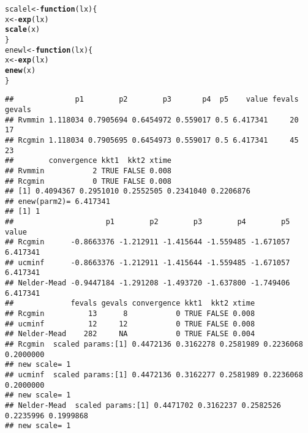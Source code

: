 \documentclass[11pt]{article}\usepackage[]{graphicx}\usepackage[]{color}
\makeatletter
\newcommand{\hlstd}[1]{\textcolor[rgb]{0.345,0.345,0.345}{#1}}%
\newcommand{\hlkwa}[1]{\textcolor[rgb]{0.161,0.373,0.58}{\textbf{#1}}}%
\newcommand{\hlkwb}[1]{\textcolor[rgb]{0.69,0.353,0.396}{#1}}%
\newcommand{\hlkwc}[1]{\textcolor[rgb]{0.333,0.667,0.333}{#1}}%
\newcommand{\hlkwd}[1]{\textcolor[rgb]{0.737,0.353,0.396}{\textbf{#1}}}%
\newenvironment{kframe}{%
 \def\at@end@of@kframe{}%
 \ifinner\ifhmode%
  \def\at@end@of@kframe{\end{minipage}}%
  \begin{minipage}{\columnwidth}%
 \fi\fi%
 \def\FrameCommand##1{\hskip\@totalleftmargin \hskip-\fboxsep
 \colorbox{shadecolor}{##1}\hskip-\fboxsep
     \hskip-\linewidth \hskip-\@totalleftmargin \hskip\columnwidth}%
 \MakeFramed {\advance\hsize-\width
   \@totalleftmargin\z@ \linewidth\hsize
   \@setminipage}}%
 {\par\unskip\endMakeFramed%
 \at@end@of@kframe}
\newenvironment{knitrout}{}{} %
\makeatother
\begin{document}
\begin{knitrout}\scriptsize
{}\color{fgcolor}\begin{kframe}
\begin{alltt}
\hlstd{scalel} \hlkwb{<-} \hlkwa{function}\hlstd{(}\hlkwc{lx}\hlstd{)\{}
  \hlstd{x}\hlkwb{<-}\hlkwd{exp}\hlstd{(lx)}
  \hlkwd{scale}\hlstd{(x)}
\hlstd{\}}
\hlstd{enewl} \hlkwb{<-} \hlkwa{function}\hlstd{(}\hlkwc{lx}\hlstd{)\{}
  \hlstd{x}\hlkwb{<-}\hlkwd{exp}\hlstd{(lx)}
  \hlkwd{enew}\hlstd{(x)}
\hlstd{\}}
\end{alltt}
\end{kframe}
\end{knitrout}

\begin{knitrout}\scriptsize
{}\color{fgcolor}\begin{kframe}


{\ttfamily\noindent\color{warningcolor}{\#\# Warning in bmchk(par, lower = lower, upper = upper): Masks (fixed parameters) set by bmchk due to tight bounds. CAUTION!!}}

{\ttfamily\noindent\color{warningcolor}{\#\# Warning in bmchk(par, lower = lower, upper = upper): Masks (fixed parameters) set by bmchk due to tight bounds. CAUTION!!}}

{\ttfamily\noindent\color{warningcolor}{\#\# Warning in bmchk(par, lower = lower, upper = upper): Masks (fixed parameters) set by bmchk due to tight bounds. CAUTION!!}}\begin{verbatim}
##              p1        p2        p3       p4  p5    value fevals gevals
## Rvmmin 1.118034 0.7905694 0.6454972 0.559017 0.5 6.417341     20     17
## Rcgmin 1.118034 0.7905695 0.6454973 0.559017 0.5 6.417341     45     23
##        convergence kkt1  kkt2 xtime
## Rvmmin           2 TRUE FALSE 0.008
## Rcgmin           0 TRUE FALSE 0.008
## [1] 0.4094367 0.2951010 0.2552505 0.2341040 0.2206876
## enew(parm2)= 6.417341
## [1] 1
##                     p1        p2        p3        p4        p5    value
## Rcgmin      -0.8663376 -1.212911 -1.415644 -1.559485 -1.671057 6.417341
## ucminf      -0.8663376 -1.212911 -1.415644 -1.559485 -1.671057 6.417341
## Nelder-Mead -0.9447184 -1.291208 -1.493720 -1.637800 -1.749406 6.417341
##             fevals gevals convergence kkt1  kkt2 xtime
## Rcgmin          13      8           0 TRUE FALSE 0.008
## ucminf          12     12           0 TRUE FALSE 0.008
## Nelder-Mead    282     NA           0 TRUE FALSE 0.004
## Rcgmin  scaled params:[1] 0.4472136 0.3162278 0.2581989 0.2236068 0.2000000
## new scale= 1 
## ucminf  scaled params:[1] 0.4472136 0.3162277 0.2581989 0.2236068 0.2000000
## new scale= 1 
## Nelder-Mead  scaled params:[1] 0.4471702 0.3162237 0.2582526 0.2235996 0.1999868
## new scale= 1
\end{verbatim}
\end{kframe}
\end{knitrout}
\end{document}
